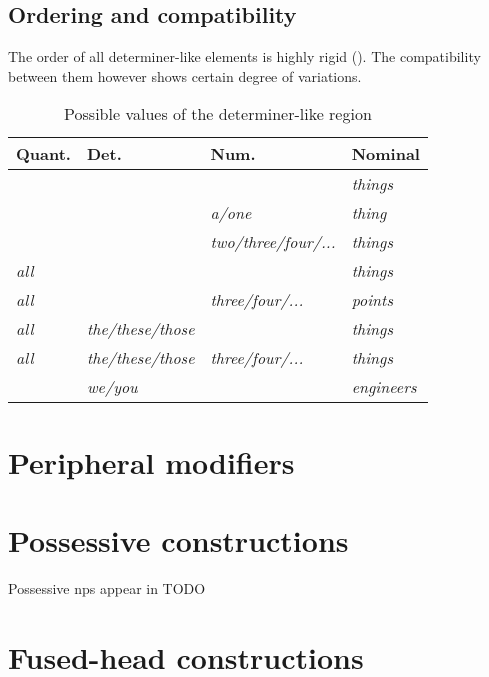 \documentclass[UTF8, a4paper, oneside, scheme=plain, 12pt]{ctexbook}
\newcommand{\form}[1]{\emph{#1}}
\begin{document}
\subsection{Ordering and compatibility}

The order of all determiner-like elements is highly rigid ().
The compatibility between them however shows certain degree of variations.

\begin{table}[H]
    \caption{Possible values of the determiner-like region}
    \label{tbl:det-region-template}
    \centering
    \begin{tabular}{llll}
    \toprule
    Quant.       & Det.                     & Num.                        & Nominal            \\ \midrule
    \form{}    & \form{}                & \form{}                   & \form{things}    \\
    \form{}    & \form{}                & \form{a/one}              & \form{thing}     \\
    \form{}    & \form{}                & \form{two/three/four/...} & \form{things}    \\
    \form{all} & \form{}                & \form{}                   & \form{things}    \\
    \form{all} & \form{}                & \form{three/four/...}     & \form{points}    \\
    \form{all} & \form{the/these/those} & \form{}                   & \form{things}    \\
    \form{all} & \form{the/these/those} & \form{three/four/...}     & \form{things}    \\
    \form{}    & \form{we/you}          & \form{}                   & \form{engineers} \\ \midrule
    \end{tabular}
\end{table}

\section{Peripheral modifiers}

\section{Possessive constructions}

Possessive \acs{np}s appear in TODO

\section{Fused-head constructions}\label{sec:np.fused-head}
\end{document}
